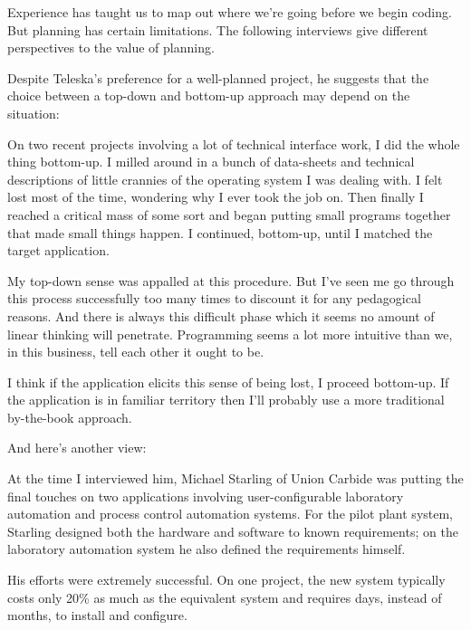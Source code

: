 \noindent Experience has taught us to map out where we're going before we begin
coding. But planning has certain limitations. The following interviews
give different perspectives to the value of planning.

\bigskip\blackline{2ex}
\noindent Despite Teleska's preference for a well-planned project, he suggests that
the choice between a top-down and bottom-up approach may depend on
the situation:

\begin{tfquot}
\noindent On two recent projects involving a lot of technical interface work, I did the
whole thing bottom-up. I milled around in a bunch of data-sheets and
technical descriptions of little crannies of the operating system I was
dealing with. I felt lost most of the time, wondering why I ever took the job on.
Then finally I reached a critical mass of some sort and began putting small
programs together that made small things happen. I continued, bottom-up,
until I matched the target application.

\noindent My top-down sense was appalled at this procedure. But I've seen me go
through this process successfully too many times to discount it for any
pedagogical reasons. And there is always this difficult phase which it seems
no amount of linear thinking will penetrate. Programming seems a lot more
intuitive than we, in this business, tell each other it ought to be.

\noindent I think if the application elicits this sense of being lost, I proceed
bottom-up. If the application is in familiar territory then I'll probably
use a more traditional by-the-book approach.
\end{tfquot}
\blackline{1ex}


\noindent And here's another view:

\bigskip\blackline{2ex}
\noindent At the time I interviewed him, Michael Starling of Union Carbide was
putting the final touches on two applications involving user-configurable
laboratory automation and process control automation systems. For the
pilot plant system, Starling designed both the hardware and software to
known requirements; on the laboratory automation system he also
defined the requirements himself.

His efforts were extremely successful. On one project, the new
system typically costs only 20\% as much as the equivalent system and
requires days, instead of months, to install and configure.

